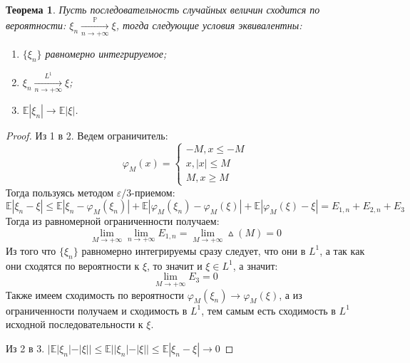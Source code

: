 \documentclass[12pt,a4paper]{article} %
\newtheorem{theorem}{Теорема}
\newcommand{\E}{\mathbb{E}}
\newcommand{\PR}{\mathbb{P}}
\begin{document}
	\begin{theorem}
		Пусть последовательность случайных величин сходится по вероятности: $\xi_n\xrightarrow[n\rightarrow+\infty]{\PR}\xi$, тогда следующие условия эквивалентны:
		\begin{enumerate}
			\item $\{\xi_n\}$ равномерно интегрируемое;
			\item $\xi_n\xrightarrow[n\rightarrow+\infty]{L^1}\xi$;
			\item $\E|\xi_n|\rightarrow\E|\xi|$.
		\end{enumerate}
	\end{theorem}
	\begin{proof}
		Из 1 в 2. Ведем ограничитель:
		$$\varphi_M(x)=
			\begin{cases}
				-M,x\leq-M\\
				x,|x|\leq M\\
				M,x\geq M
			\end{cases}
		$$
		Тогда пользуясь методом $\varepsilon/3$-приемом:
		$$\E|\xi_n-\xi|\leq\E|\xi_n-\varphi_M(\xi_n)|+\E|\varphi_M(\xi_n)-\varphi_M(\xi)|+\E|\varphi_M(\xi)-\xi|=E_{1,n}+E_{2,n}+E_3$$
		Тогда из равномерной ограниченности получаем:
		$$\lim\limits_{M\rightarrow+\infty}\lim\limits_{n\rightarrow+\infty}E_{1,n}=\lim\limits_{M\rightarrow+\infty}\vartriangle(M)=0$$
		Из того что $\{\xi_n\}$ равномерно интегрируемы сразу следует, что они в $L^1$, а так как они сходятся по вероятности к $\xi$, то значит и $\xi\in L^1$, а значит:
		$$\lim\limits_{M\rightarrow+\infty}E_3=0$$
		Также имеем сходимость по вероятности $\varphi_M(\xi_n)\rightarrow\varphi_M(\xi)$, а из ограниченности получаем и сходимость в $L^1$, тем самым есть сходимость в $L^1$ исходной последовательности к $\xi$.
		
		Из 2 в 3. $|\E|\xi_n|-|\xi||\leq\E||\xi_n|-|\xi||\leq\E|\xi_n-\xi|\rightarrow0$
		

\end{proof}
\end{document}
